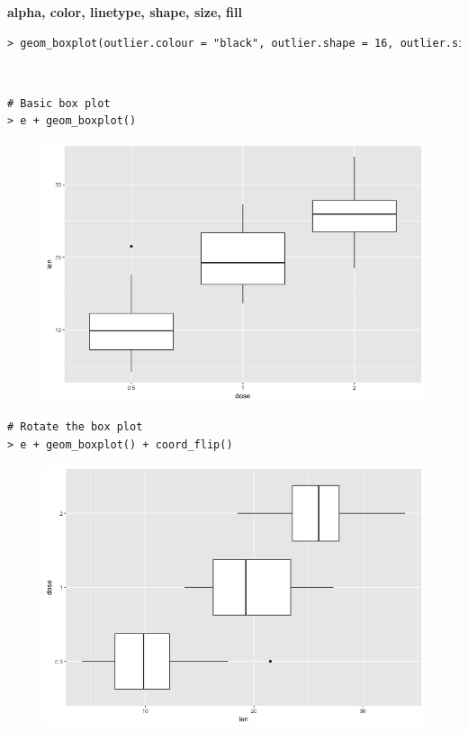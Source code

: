 \textbf{alpha, color, linetype, shape, size, fill}\newline
\begin{lstlisting}[language=html]
> geom_boxplot(outlier.colour = "black", outlier.shape = 16, outlier.size = 2, notch = FALSE)
\end{lstlisting}
\textcolor{white}{.}\newline
\begin{lstlisting}[language=html]
# Basic box plot
> e + geom_boxplot()
\end{lstlisting}
\begin{figure}[H]\begin{center}\includegraphics[scale=1 ]{ilu/bg70.png}\end{center}\end{figure}
\begin{lstlisting}[language=html]
# Rotate the box plot
> e + geom_boxplot() + coord_flip()
\end{lstlisting}
\begin{figure}[H]\begin{center}\includegraphics[scale=1 ]{ilu/bg71.png}\end{center}\end{figure}
